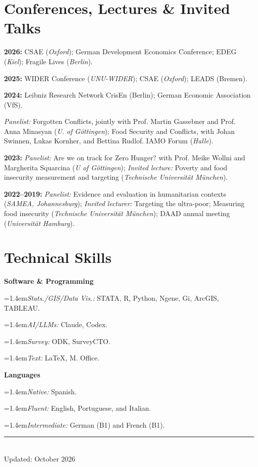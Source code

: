 \documentclass[10pt]{article}
\newcommand{\indentline}[1]{{\leftskip=1.4em\noindent\ignorespaces#1\par}} %
\begin{document}
\section{Conferences, Lectures \& Invited Talks}
\textbf{2026:} CSAE (\textit{Oxford}); German Development Economics Conference; EDEG (\textit{Kiel}); Fragile Lives (\textit{Berlin}).\par
\textbf{2025:} WIDER Conference (\textit{UNU-WIDER}); CSAE (\textit{Oxford}); LEADS (Bremen).\par
\textbf{2024:} Leibniz Research Network CrisEn (Berlin); German Economic Association (VfS).\par
\textit{Panelist:} Forgotten Conflicts, jointly with Prof. Martin Gassebner and Prof. Anna Minasyan (\textit{U. of Göttingen}); Food Security and Conflicts, with Johan Swinnen, Lukas Kornher, and Bettina Rudlof. IAMO Forum (\textit{Halle}).\par
\textbf{2023:} \textit{Panelist:} Are we on track for Zero Hunger? with Prof. Meike Wollni and Margherita Squarcina (\textit{U of Göttingen}); \textit{Invited lecture:} Poverty and food insecurity measurement and targeting (\textit{Technische Universität München}).\par
\textbf{2022--2019:} \textit{Panelist:} Evidence and evaluation in humanitarian contexts (\textit{SAMEA, Johannesburg}); \textit{Invited lecturer:} Targeting the ultra-poor; Measuring food insecurity (\textit{Technische Universität München}); DAAD annual meeting (\textit{Universität Hamburg}).\par

\section{Technical Skills}
\textbf{Software \& Programming}\par
\indentline{\textit{Stats./GIS/Data Vis.:} STATA, R, Python, Ngene, Gi, ArcGIS, TABLEAU.}
\indentline{\textit{AI/LLMs:} Claude, Codex.}
\indentline{\textit{Survey:} ODK, SurveyCTO.}
\indentline{\textit{Text:} LaTeX, M. Office.}
\textbf{Languages}\par
\indentline{\textit{Native:} Spanish.}
\indentline{\textit{Fluent:} English, Portuguese, and Italian.}
\indentline{\textit{Intermediate:} German (B1) and French (B1).}

\vfill
\begin{center}
  {\color{cvgrey}\rule{4em}{0.4pt}}\\[0.25em]
  \textcolor{cvgrey}{Updated: October 2026}
\end{center}
\end{document}
